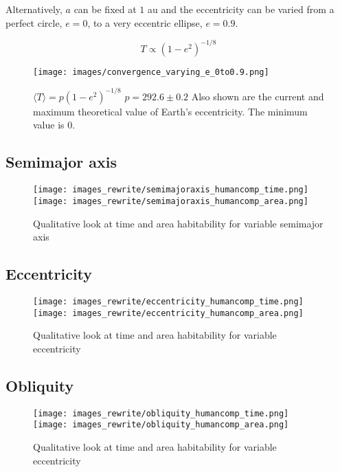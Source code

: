 \documentclass[12pt, onecolumn]{revtex4-2}    %
\begin{document}
Alternatively, $a$ can be fixed at $1$ au and the eccentricity can be varied from a perfect circle, $e = 0$, to a very eccentric ellipse, $e = 0.9$.


\begin{equation}
  T \propto (1-e^2)^{-1/8} \label{eq:T_propto_e}
\end{equation}
\begin{figure}
  \texttt{[image: images/convergence\_varying\_e\_0to0.9.png]}
  \caption{
    $\langle T \rangle = p(1-e^2)^{-1/8}$
    $p = 292.6 \pm 0.2$
    Also shown are the current and maximum theoretical value of Earth's eccentricity.
    The minimum value is $0$.
  }
  \label{fig:planet_eccentricity}
\end{figure}

\subsection{Semimajor axis} \label{ssec:qualitative_semimajoraxis}
\begin{figure}
  \texttt{[image: images\_rewrite/semimajoraxis\_humancomp\_time.png]}
  \texttt{[image: images\_rewrite/semimajoraxis\_humancomp\_area.png]}
  \caption{
    Qualitative look at time and area habitability for variable semimajor axis
  }
  \label{fig:qualitative_semimajoraxis}
\end{figure}


\subsection{Eccentricity} \label{ssec:qualitative_eccentricity}
\begin{figure}
  \texttt{[image: images\_rewrite/eccentricity\_humancomp\_time.png]}
  \texttt{[image: images\_rewrite/eccentricity\_humancomp\_area.png]}
  \caption{
    Qualitative look at time and area habitability for variable eccentricity
  }
  \label{fig:qualitative_eccentricity}
\end{figure}

\subsection{Obliquity} \label{ssec:qualitative_obliquity}
\begin{figure}
  \texttt{[image: images\_rewrite/obliquity\_humancomp\_time.png]}
  \texttt{[image: images\_rewrite/obliquity\_humancomp\_area.png]}
  \caption{
    Qualitative look at time and area habitability for variable eccentricity
  }
  \label{fig:qualitative_obliquity}
\end{figure}
\end{document}
